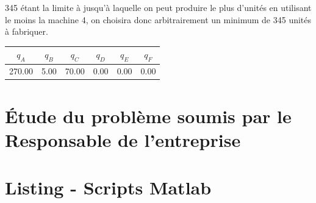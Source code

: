 \documentclass[paper=a4, fontsize=11pt]{scrartcl}
\numberwithin{equation}{section}		%
\numberwithin{figure}{section}			%
\numberwithin{table}{section}				%
\begin{document}
345 étant la limite à jusqu'à laquelle on peut produire le plus d’unités en utilisant le moins la machine 4, on choisira donc arbitrairement un minimum de 345 unités à fabriquer.

\begin{center}
\begin{tabular}{cccccc}
\hline
$q_A$ & $q_B$ & $q_C$ & $q_D$ & $q_E$ & $q_F$ \\
\hline
270.00 & 5.00 & 70.00 & 0.00 & 0.00 & 0.00 \\
\hline
\end{tabular}
\end{center}

\section{\'Etude du problème soumis par le Responsable de l'entreprise}

\newpage

\section{Listing - Scripts Matlab}

\lstlistoflistings







\end{document}
